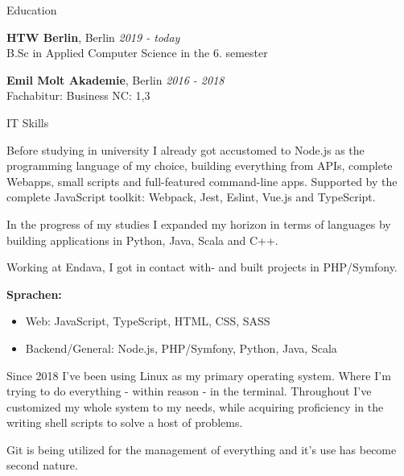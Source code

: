 \documentclass{cv}
\begin{document}
\begin{rSection}{Education}

{\bf HTW Berlin}, Berlin \hfill {\em 2019 - today}\\
B.Sc in Applied Computer Science
\hfill in the 6. semester

\smallskip

{\bf Emil Molt Akademie}, Berlin \hfill {\em 2016 - 2018}\\
Fachabitur: Business
\hfill NC: 1,3

\end{rSection}

\begin{rSection}{IT Skills}

  \newcommand\skillWidth{0.48}
  \begin{minipage}[t]{\skillWidth\linewidth}

Before studying in university I already got accustomed to Node.js as the
programming language of my choice, building everything from APIs, complete
Webapps, small scripts and full-featured command-line apps.
Supported by the complete JavaScript toolkit: Webpack, Jest, Eslint, Vue.js and
TypeScript.

    \medskip

In the progress of my studies I expanded my horizon in terms of languages by
building applications in Python, Java, Scala and C++.

    \medskip

Working at Endava, I got in contact with- and built projects in PHP/Symfony.

    \medskip

    \textbf{Sprachen:}
    \begin{itemize}
      \item Web: JavaScript, TypeScript, HTML, CSS, SASS
      \item Backend/General: Node.js, PHP/Symfony, Python, Java, Scala
    \end{itemize}
  \end{minipage}
  \hfill
  \begin{minipage}[t]{\skillWidth\linewidth}

Since 2018 I've been using Linux as my primary operating system. Where I'm trying to do everything - within reason - in the terminal.
Throughout I've customized my whole system to my needs, while acquiring proficiency in the writing shell scripts to solve a host of problems.

    \medskip

Git is being utilized for the management of everything and it's use has become second nature.


\end{minipage}
\end{rSection}
\end{document}
